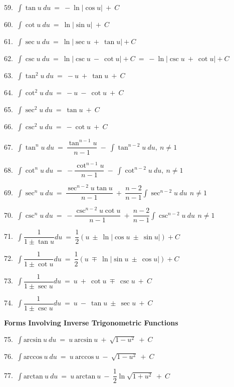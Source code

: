 \documentclass{article}
\begin{document}
\begin{large}
\begin{small}
59.\ $\displaystyle\int \tan u\ du\ =\ -\ln|\cos u|\ +\ C$

60.\ $\displaystyle\int \cot u\ du\ =\ \ln|\sin u|\ +\ C$

61.\ $\displaystyle\int \sec u\ du\ =\ \ln|\sec u\ +\ \tan u| + C$

62.\ $\displaystyle\int \csc u\ du\ =\ \ln|\csc u\ -\ \cot u| + C\ =\ -\ln|\csc u\ +\ \cot u| + C$

63.\ $\displaystyle\int \tan^{2} u\ du\ =\ -u\ +\ \tan u\ +\ C$

64.\ $\displaystyle\int \cot^{2} u\ du\ =\ -u\ -\ \cot u\ +\ C$

65.\ $\displaystyle\int \sec^{2} u\ du\ =\ \tan u\ +\ C$

66.\ $\displaystyle\int \csc^{2} u\ du\ =\ -\cot u\ +\ C$

67.\ $\displaystyle\int \tan^{n} u\ du\ =\ \dfrac{\tan^{n-1}u}{n-1}\ -\ \displaystyle\int \tan^{n-2}u\ du,\ n\neq 1$

68.\ $\displaystyle\int \cot^{n} u\ du\ =\ -\dfrac{\cot^{n-1}u}{n-1}\ -\ \displaystyle\int \cot^{n-2}u\ du,\ n\neq 1$

69.\ $\displaystyle\int \sec^{n} u\ du\ =\ \dfrac{\sec^{n-2}u\tan u}{n-1}\ +\ \dfrac{n-2}{n-1}\displaystyle\int \sec^{n-2}u\ du\,\ n\neq 1$

70.\ $\displaystyle\int \csc^{n} u\ du\ =\ -\dfrac{\csc^{n-2}u\cot u}{n-1}\ +\ \dfrac{n-2}{n-1}\displaystyle\int \csc^{n-2}u\ du\,\ n\neq 1$

71.\ $\displaystyle\int \dfrac{1}{1\pm \tan u}du\ =\ \dfrac{1}{2}(u\ \pm\ \ln|\cos u\ \pm\ \sin u|) + C$

72.\ $\displaystyle\int \dfrac{1}{1\pm \cot u}du\ =\ \dfrac{1}{2}(u\ \mp\ \ln|\sin u\ \pm\ \cos u|) + C$

73.\ $\displaystyle\int \dfrac{1}{1\pm \sec u}du\ =\ u\ +\ \cot u\ \mp\ \csc u\ +\ C$

74.\ $\displaystyle\int \dfrac{1}{1\pm \csc u}du\ =\ u\ -\ \tan u\ \pm\ \sec u\ +\ C$

\textbf{Forms Involving Inverse Trigonometric Functions}

75.\ $\displaystyle\int \text{arcsin}\ u\ du\ =\ u\ \text{arcsin}\ u\ +\ \sqrt{1-u^{2}}\ +\ C$

76.\ $\displaystyle\int \text{arccos}\ u\ du\ =\ u\ \text{arccos}\ u\ -\ \sqrt{1-u^{2}}\ +\ C$

77.\ $\displaystyle\int \text{arctan}\ u\ du\ =\ u\ \text{arctan}\ u\ -\ \dfrac{1}{2}\ln\sqrt{1+u^{2}}\ +\ C$


\end{small}
\end{large}
\end{document}
